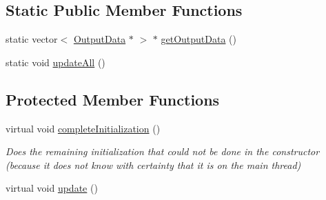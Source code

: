 \subsection*{Static Public Member Functions}
\begin{DoxyCompactItemize}
\item 
static vector$<$ \hyperlink{struct_output_data}{Output\-Data} $\ast$ $>$ $\ast$ \hyperlink{struct_output_data_ad67cc040f7336e2c4de57bd852bf3116}{get\-Output\-Data} ()
\item 
static void \hyperlink{struct_output_data_a1d35bb8a17ff06cd584d879bf30b2445}{update\-All} ()
\end{DoxyCompactItemize}
\subsection*{Protected Member Functions}
\begin{DoxyCompactItemize}
\item 
virtual void \hyperlink{struct_output_data_a7bca309627422d32bd485356394a4ed8}{complete\-Initialization} ()
\begin{DoxyCompactList}\small\item\em Does the remaining initialization that could not be done in the constructor (because it does not know with certainty that it is on the main thread) \end{DoxyCompactList}\item 
virtual void \hyperlink{struct_output_data_aed0e4b81a7c981a7f2a0d6128ee69eb7}{update} ()
\end{DoxyCompactItemize}

